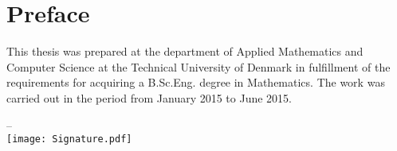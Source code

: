 \chapter{Preface}
This thesis was prepared at the department of Applied Mathematics and Computer Science at the Technical University of Denmark in fulfillment of the requirements for acquiring a B.Sc.Eng. degree in Mathematics. The work was carried out in the period from January 2015 to June 2015.

\vfill

{
\centering
    \thesislocation{} – \thesisdeadline{}\\[1cm]
    \hspace{3cm}\texttt{[image: Signature.pdf]}\\[1cm]
\begin{flushright}
    \thesisauthor{}
\end{flushright}
}
